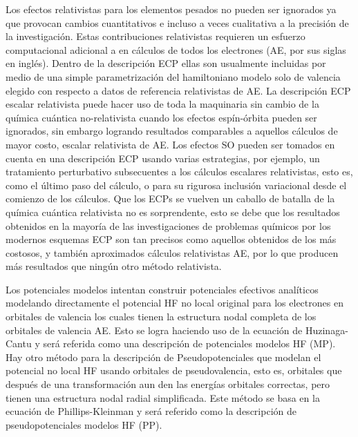 Los efectos relativistas para los elementos pesados no pueden ser 
ignorados ya que provocan cambios cuantitativos e incluso a veces 
cualitativa a la precisi\'on de la investigaci\'on. Estas
contribuciones relativistas requieren un esfuerzo computacional 
adicional a en c\'alculos de todos los electrones (AE, por sus siglas
en ingl\'es). Dentro de la descripci\'on ECP ellas son usualmente 
incluidas por medio de una simple parametrizaci\'on del hamiltoniano 
modelo solo de valencia elegido con respecto a datos de referencia 
relativistas de AE. La descripci\'on ECP escalar relativista puede 
hacer uso de toda la maquinaria sin cambio de la qu\'imica cu\'antica
no-relativista cuando los efectos esp\'in-\'orbita pueden ser 
ignorados, sin embargo logrando resultados comparables a aquellos 
c\'alculos de mayor costo, escalar relativista de AE. Los efectos SO 
pueden ser tomados en cuenta en una descripci\'on ECP usando varias 
estrategias, por ejemplo, un tratamiento perturbativo subsecuentes a
los c\'alculos escalares relativistas, esto es, como el \'ultimo paso
del c\'alculo, o para su rigurosa inclusi\'on variacional desde el 
comienzo de los c\'alculos. Que los ECPs se vuelven un caballo de 
batalla de la qu\'imica cu\'antica relativista no es sorprendente, 
esto se debe que los resultados obtenidos en la mayor\'ia de las 
investigaciones de problemas qu\'imicos por los modernos esquemas ECP
son tan precisos como aquellos obtenidos de los m\'as costosos, y
tambi\'en aproximados c\'alculos relativistas AE, por lo que producen
m\'as resultados que ning\'un otro m\'etodo relativista. 

Los potenciales modelos intentan construir potenciales efectivos
anal\'iticos modelando directamente el potencial HF no local original
para los electrones en orbitales de valencia los cuales tienen la 
estructura nodal completa de los orbitales de valencia AE. Esto se
logra haciendo uso de la ecuaci\'on de Huzinaga-Cantu y ser\'a 
referida como una descripci\'on de potenciales modelos HF (MP). 
Hay otro m\'etodo para la descripci\'on de Pseudopotenciales que 
modelan el potencial no local HF usando orbitales de pseudovalencia, 
esto es, orbitales que despu\'es de una transformaci\'on aun den las 
energ\'ias orbitales correctas, pero tienen una estructura nodal 
radial simplificada. Este m\'etodo se basa en la ecuaci\'on de 
Phillips-Kleinman y ser\'a referido como la descripci\'on de 
pseudopotenciales modelos HF (PP).

